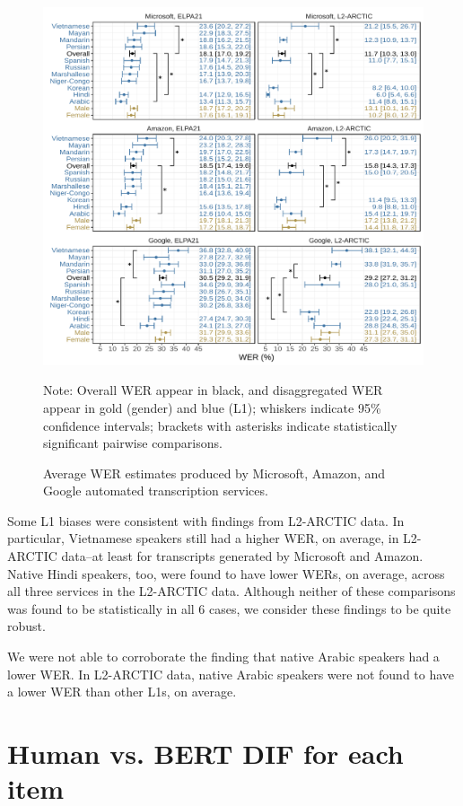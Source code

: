 \documentclass [PhD] {uclathes}
\begin{document}
\begin{figure}[h]
    \centering
    \caption{Average WER estimates produced by Microsoft, Amazon, and Google automated transcription services.}
    \includegraphics[width=6.5in]{figures/20230308_wer_plot_cmb_sigBars.pdf}
    \label{fig:wer_l2}
{Note: Overall WER appear in black, and disaggregated WER appear in gold (gender) and blue (L1); whiskers indicate 95\% confidence intervals; brackets with asterisks indicate statistically significant pairwise comparisons. \par}
\end{figure}

Some L1 biases were consistent with findings from L2-ARCTIC data. In particular, Vietnamese speakers still had a higher WER, on average, in L2-ARCTIC data--at least for transcripts generated by Microsoft and Amazon. Native Hindi speakers, too, were found to have lower WERs, on average, across all three services in the L2-ARCTIC data. Although neither of these comparisons was found to be statistically in all 6 cases, we consider these findings to be quite robust. 

We were not able to corroborate the finding that native Arabic speakers had a lower WER. In L2-ARCTIC data, native Arabic speakers were not found to have a lower WER than other L1s, on average. 

\section{Human vs. BERT DIF for each item}
\label{sec:appendix_z_itm}
\end{document}
